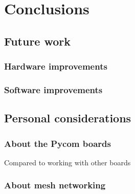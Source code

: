 
\chapter{Conclusions}\label{ch:conclusions}

	\section{Future work}
	
		\subsection{Hardware improvements}
			

		\subsection{Software improvements}

	\section{Personal considerations}
	
		\subsection{About the Pycom boards}
		
			Compared to working with other boards
			
		\subsection{About mesh networking}

